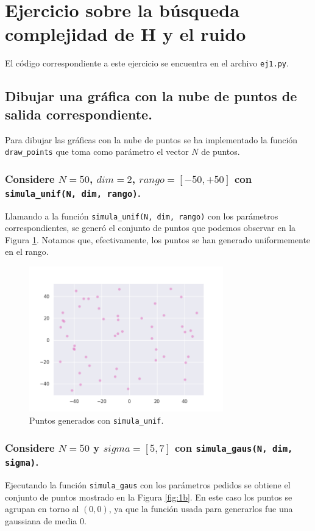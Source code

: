 \documentclass[a4paper, 20pt]{article}
\begin{document}
\large
\section{Ejercicio sobre la búsqueda complejidad de H y el ruido}
El código correspondiente a este ejercicio se encuentra en el archivo \texttt{ej1.py}.
\subsection{Dibujar una gráfica con la nube de puntos de salida correspondiente.}
Para dibujar las gráficas con la nube de puntos se ha implementado la función \texttt{draw\_points} que toma como parámetro el vector $N$ de puntos.
\subsubsection{Considere $N = 50$, $dim = 2$, $rango = [-50, +50]$ con \texttt{simula\_unif(N, dim, rango)}.}
Llamando a la función \texttt{simula\_unif(N, dim, rango)} con los parámetros correspondientes, se generó el conjunto de puntos que podemos observar en la Figura \ref{fig:1a}. Notamos que, efectivamente, los puntos se han generado uniformemente en el rango.

\begin{figure}[H]
    \centering
    \includegraphics[width=0.75\textwidth]{points1a}
    \caption{Puntos generados con \texttt{simula\_unif}.}
    \label{fig:1a}
\end{figure}

\subsubsection{Considere $N = 50$ y $sigma = [5,7]$ con \texttt{simula\_gaus(N, dim, sigma)}.}
Ejecutando la función \texttt{simula\_gaus} con los parámetros pedidos se obtiene el conjunto de puntos mostrado en la Figura \ref{fig:1b}. En este caso los puntos se agrupan en torno al $(0,0)$, ya que la función usada para generarlos fue una gaussiana de media 0.
\end{document}
